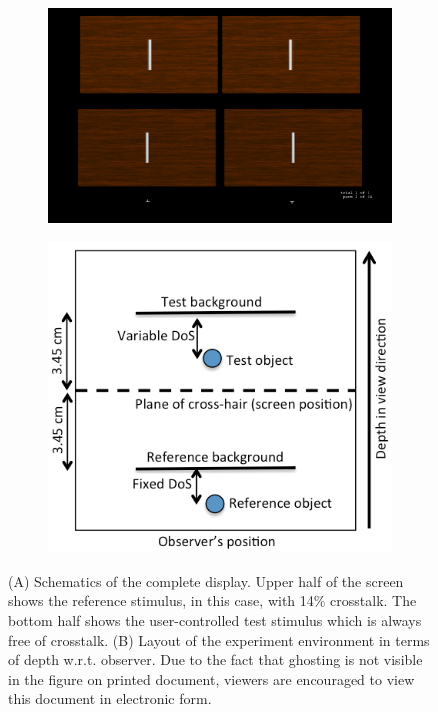 \begin{figure}[htbp]
    \centering
    \begin{subfigure}[b]{0.8\textwidth}
        \includegraphics[width=\textwidth]{./Template_Figures/exp_env}
        \caption{}\label{fig:exp_env}
    \end{subfigure}

    \begin{subfigure}[b]{0.4\textwidth}
        \includegraphics[width=\textwidth]{./Template_Figures/exp_env_depth}
        \caption{}\label{fig:exp_env_depth}
    \end{subfigure}

    \caption{(A) Schematics of the complete display. Upper half of the screen shows the reference stimulus, in this case, with 14\% crosstalk. The bottom half shows the user-controlled test stimulus which is always free of crosstalk. (B) Layout of the experiment environment in terms of depth w.r.t. observer. Due to the fact that ghosting is not visible in the figure on printed document, viewers are encouraged to view this document in electronic form.\label{fig:exp_env_overall}}
\end{figure}

